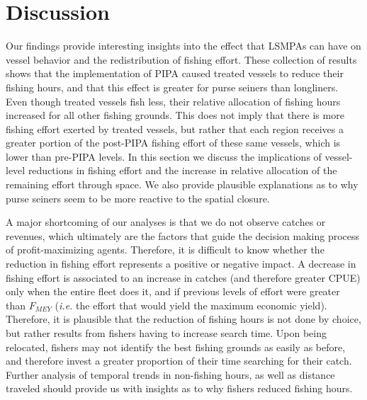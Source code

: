\documentclass[11pt,]{article}
\begin{document}
\clearpage

\hypertarget{discussion}{%
\section{Discussion}\label{discussion}}

Our findings provide interesting insights into the effect that LSMPAs
can have on vessel behavior and the redistribution of fishing effort.
These collection of results shows that the implementation of PIPA caused
treated vessels to reduce their fishing hours, and that this effect is
greater for purse seiners than longliners. Even though treated vessels
fish less, their relative allocation of fishing hours increased for all
other fishing grounds. This does not imply that there is more fishing
effort exerted by treated vessels, but rather that each region receives
a greater portion of the post-PIPA fishing effort of these same vessels,
which is lower than pre-PIPA levels. In this section we discuss the
implications of vessel-level reductions in fishing effort and the
increase in relative allocation of the remaining effort through space.
We also provide plausible explanations as to why purse seiners seem to
be more reactive to the spatial closure.

A major shortcoming of our analyses is that we do not observe catches or
revenues, which ultimately are the factors that guide the decision
making process of profit-maximizing agents. Therefore, it is difficult
to know whether the reduction in fishing effort represents a positive or
negative impact. A decrease in fishing effort is associated to an
increase in catches (and therefore greater CPUE) only when the entire
fleet does it, and if previous levels of effort were greater than
\(F_{MEY}\) (\emph{i.e.} the effort that would yield the maximum
economic yield). Therefore, it is plausible that the reduction of
fishing hours is not done by choice, but rather results from fishers
having to increase search time. Upon being relocated, fishers may not
identify the best fishing grounds as easily as before, and therefore
invest a greater proportion of their time searching for their catch.
Further analysis of temporal trends in non-fishing hours, as well as
distance traveled should provide us with insights as to why fishers
reduced fishing hours.
\end{document}

